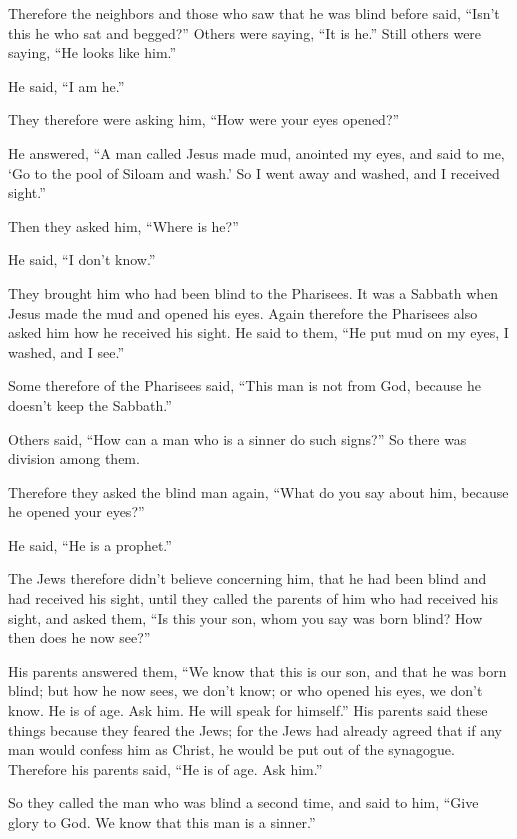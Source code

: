  Therefore the neighbors and those who saw that he was blind
before said, ``Isn't this he who sat and begged?''  Others
were saying, ``It is he.'' Still others were saying, ``He looks like
him.''

He said, ``I am he.''

 They therefore were asking him, ``How were your eyes
opened?''

 He answered, ``A man called Jesus made mud, anointed my
eyes, and said to me, `Go to the pool of Siloam and wash.' So I went
away and washed, and I received sight.''

 Then they asked him, ``Where is he?''

He said, ``I don't know.''

 They brought him who had been blind to the Pharisees.
 It was a Sabbath when Jesus made the mud and opened his
eyes.  Again therefore the Pharisees also asked him how he
received his sight. He said to them, ``He put mud on my eyes, I washed,
and I see.''

 Some therefore of the Pharisees said, ``This man is not
from God, because he doesn't keep the Sabbath.''

Others said, ``How can a man who is a sinner do such signs?'' So there
was division among them.

 Therefore they asked the blind man again, ``What do you
say about him, because he opened your eyes?''

He said, ``He is a prophet.''

 The Jews therefore didn't believe concerning him, that he
had been blind and had received his sight, until they called the parents
of him who had received his sight,  and asked them, ``Is
this your son, whom you say was born blind? How then does he now see?''

 His parents answered them, ``We know that this is our son,
and that he was born blind;  but how he now sees, we don't
know; or who opened his eyes, we don't know. He is of age. Ask him. He
will speak for himself.''  His parents said these things
because they feared the Jews; for the Jews had already agreed that if
any man would confess him as Christ, he would be put out of the
synagogue.  Therefore his parents said, ``He is of age. Ask
him.''

 So they called the man who was blind a second time, and
said to him, ``Give glory to God. We know that this man is a sinner.''

